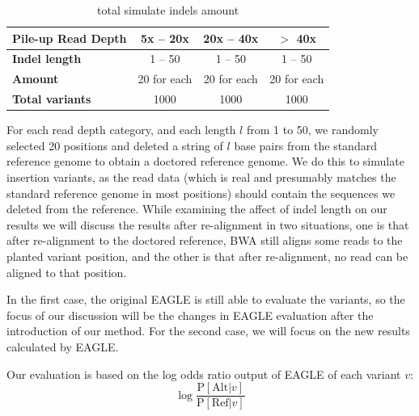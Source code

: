 \vspace{0.5cm}
\begin{table}[ht]
\center
\caption[total simulate indels amount]{total simulate indels amount}
\vspace{-0.5cm}
\begin{tabular}{|l|c|c|c|}
\hline
\rowcolor{lightgray}
\textbf{Pile-up Read Depth}&    \textbf{5x -- 20x} &    \textbf{20x -- 40x} &    \textbf{$>$ 40x}\\
\hline
\cellcolor{lightgray}\textbf{Indel length} &   1 -- 50&     1 -- 50&     1 -- 50\\
\hline
\cellcolor{lightgray}\textbf{Amount} &   20 for each&    20 for each&     20 for each\\
\hline
\cellcolor{lightgray}\textbf{Total variants} &   1000&     1000&     1000\\
\hline
\end{tabular}
\label{tab:simulate-amount}
\end{table}


For each read depth category, and each length $l$ from 1 to 50, we randomly selected 20 positions and deleted a string of $l$ base pairs from the standard reference genome to obtain a doctored reference genome.  We do this to simulate insertion variants, as the read data (which is real and presumably matches the standard reference genome in most positions) should contain the sequences we deleted from the reference.  While examining the affect of indel length on our results we will discuss the results after re-alignment in two situations, one is that after re-alignment to the doctored reference, BWA still aligns some reads to the planted variant position, and the other is that after re-alignment, no read can be aligned to that position.

In the first case, the original EAGLE is still able to evaluate the variants, so the focus of our discussion will be the changes in EAGLE evaluation after the introduction of our method. For the second case, we will focus on the new results calculated by EAGLE.

\begin{samepage}
\noindent
Our evaluation is based on the log odds ratio output of EAGLE of each variant $v$:
\begin{equation*}
\log \frac{\text{P}[\text{Alt} | v]}{\text{P}[\text{Ref} | v]}
\end{equation*}
\end{samepage}


